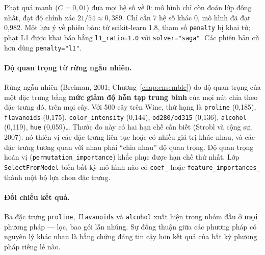 Phạt quá mạnh ($C = 0{,}01$) đưa mọi hệ số về 0: mô hình chỉ còn đoán lớp đông nhất, đạt độ chính xác $21/54 \approx 0{,}389$. Chỉ cần 7 hệ số khác 0, mô hình đã đạt 0,982. Một lưu ý về phiên bản: từ scikit-learn 1.8, tham số \texttt{penalty} bị khai tử; phạt L1 được khai báo bằng \texttt{l1\_ratio=1.0} với \texttt{solver="saga"}. Các phiên bản cũ hơn dùng \texttt{penalty="l1"}.

\paragraph{Độ quan trọng từ rừng ngẫu nhiên.} Rừng ngẫu nhiên (Breiman, 2001; Chương~\ref{chap:ensemble}) đo độ quan trọng của một đặc trưng bằng \textbf{mức giảm độ hỗn tạp trung bình} của mọi nút chia theo đặc trưng đó, trên mọi cây. Với 500 cây trên Wine, thứ hạng là \texttt{proline} (0,185), \texttt{flavanoids} (0,175), \texttt{color\_intensity} (0,144), \texttt{od280/od315} (0,136), \texttt{alcohol} (0,119), \texttt{hue} (0,059)\ldots{} Thước đo này có hai hạn chế cần biết (Strobl và cộng sự, 2007): nó thiên vị các đặc trưng liên tục hoặc có nhiều giá trị khác nhau, và các đặc trưng tương quan với nhau phải ``chia nhau'' độ quan trọng. Độ quan trọng hoán vị (\texttt{permutation\_importance}) khắc phục được hạn chế thứ nhất. Lớp \texttt{SelectFromModel} biến bất kỳ mô hình nào có \texttt{coef\_} hoặc \texttt{feature\_importances\_} thành một bộ lựa chọn đặc trưng.

\paragraph{Đối chiếu kết quả.} Ba đặc trưng \texttt{proline}, \texttt{flavanoids} và \texttt{alcohol} xuất hiện trong nhóm đầu ở \textbf{mọi} phương pháp --- lọc, bao gói lẫn nhúng. Sự đồng thuận giữa các phương pháp có nguyên lý khác nhau là bằng chứng đáng tin cậy hơn kết quả của bất kỳ phương pháp riêng lẻ nào.

